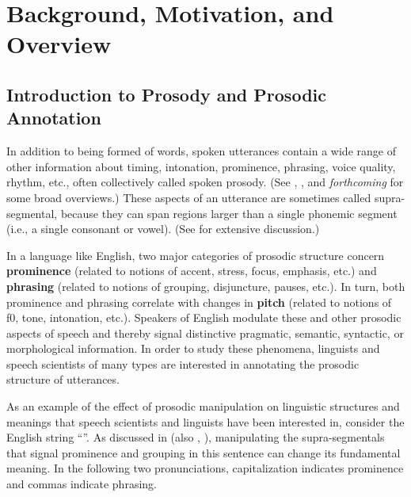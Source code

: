 \chapter{Background, Motivation, and Overview}\label{ch:background}

\section{Introduction to Prosody and Prosodic Annotation}\label{sec:introduction-to-prosody-and-prosodic-annotation}

In addition to being formed of words, spoken utterances contain a wide range of other information about timing, intonation, prominence, phrasing, voice quality, rhythm, etc., often collectively called spoken prosody. (See \citealt{ladd08}, \citealt{beckmanvenditti11}, and \citeauthor{barnesshattuckhufnagel20} \textit{forthcoming} for some broad overviews.) These aspects of an utterance are sometimes called supra-segmental, because they can span regions larger than a single phonemic segment (i.e., a single consonant or vowel). (See \citealt{lehiste70} for extensive discussion.)

In a language like English, two major categories of prosodic structure concern \textbf{prominence} (related to notions of accent, stress, focus, emphasis, etc.) and \textbf{phrasing} (related to notions of grouping, disjuncture, pauses, etc.). In turn, both prominence and phrasing correlate with changes in \textbf{pitch} (related to notions of f0, tone, intonation, etc.). Speakers of English modulate these and other prosodic aspects of speech and thereby signal distinctive pragmatic, semantic, syntactic, or morphological information. In order to study these phenomena, linguists and speech scientists of many types are interested in annotating the prosodic structure of utterances.

As an example of the effect of prosodic manipulation on linguistic structures and meanings that speech scientists and linguists have been interested in, consider the English string “”. As discussed in \citealt{lehiste73} (also \citealt{price-91}, \citealt{veilleux-06}), manipulating the supra-segmentals that signal prominence and grouping in this sentence can change its fundamental meaning. In the following two pronunciations, capitalization indicates prominence and commas indicate phrasing.

